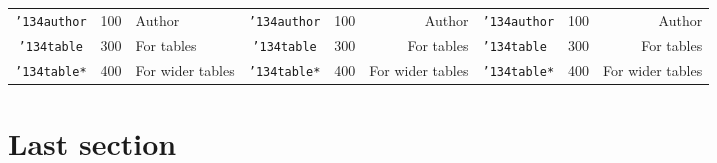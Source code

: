 \begin{pdflandscape}
\begin{vplace}
\begin{table}[h]
\begin{tabular}{cclccrlcr}
				\texttt{{\char'134}author} & 100      & Author           & \texttt{{\char'134}author} & 100      & Author           & \texttt{{\char'134}author} & 100      & Author           \\
				\texttt{{\char'134}table}  & 300      & For tables       & \texttt{{\char'134}table}  & 300      & For tables       & \texttt{{\char'134}table}  & 300      & For tables       \\
				\texttt{{\char'134}table*} & 400      & For wider tables & \texttt{{\char'134}table*} & 400      & For wider tables & \texttt{{\char'134}table*} & 400      & For wider tables \\
				\bottomrule
			\end{tabular}
		\end{table}
	\end{vplace}
\end{pdflandscape}



\section{Last section}
\lipsum[6-7]